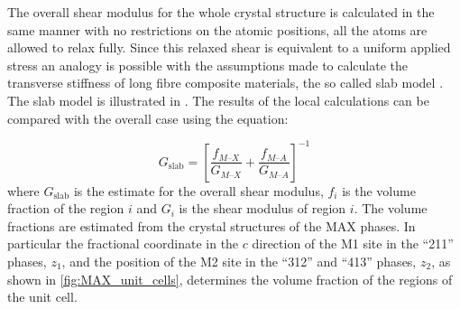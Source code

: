 The overall shear modulus for the whole crystal structure is calculated in the same manner with no restrictions on the atomic positions, all the atoms are allowed to relax fully. Since this relaxed shear is equivalent to a uniform applied stress an analogy is possible with the assumptions made to calculate the transverse stiffness of long fibre composite materials, the so called slab model \cite{Hull1996ch4}. The slab model is illustrated in . The results of the local calculations can be compared with the overall case using the equation:

\begin{equation}
G_{\text{slab}} = \left[ \frac{f_{M\text{--}X}}{G_{M\text{--}X}} + \frac{f_{M\text{--}A}}{G_{M\text{--}A}} \right]^{-1}
\end{equation}
where $G_{\text{slab}}$ is the estimate for the overall shear modulus, $f_i$ is the volume fraction of the region $i$ and $G_i$ is the shear modulus of region $i$. The volume fractions are estimated from the crystal structures of the MAX phases. In particular the fractional coordinate in the $c$ direction of the M1 site in the ``211'' phases, $z_1$, and the position of the M2 site in the ``312'' and ``413'' phases, $z_2$, as shown in \autoref{fig:MAX_unit_cells}, determines the volume fraction of the regions of the unit cell.













